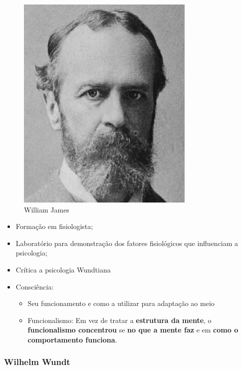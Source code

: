 \documentclass[
]{book}
\providecommand{\tightlist}{%
  \setlength{\itemsep}{0pt}\setlength{\parskip}{0pt}}
\begin{document}
\begin{figure}

{\centering \includegraphics[width=0.5\linewidth]{imagens/WilliamJames} 

}

\caption{William James}\label{fig:unnamed-chunk-4}
\end{figure}

\begin{itemize}
\tightlist
\item
  Formação em fisiologista;
\item
  Laboratório para demonstração dos fatores fisiológicos que influenciam a psicologia;
\item
  Crítica a psicologia Wundtiana
\item
  Consciência:

  \begin{itemize}
  \tightlist
  \item
    Seu funcionamento e como a utilizar para adaptação ao meio
  \item
    Funcionalismo: Em vez de tratar a \textbf{estrutura da mente}, o \textbf{funcionalismo concentrou} se \textbf{no que a mente faz} e em \textbf{como o comportamento funciona}.
  \end{itemize}
\end{itemize}

\hypertarget{wilhelm-wundt}{%
\subsubsection{Wilhelm Wundt}\label{wilhelm-wundt}}
\end{document}

